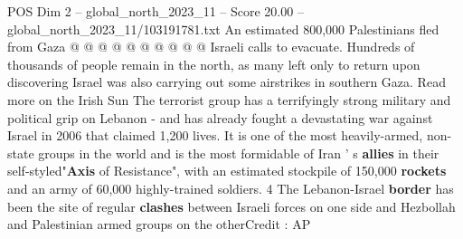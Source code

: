 \begin{textsample}{POS Dim 2 – global\_north\_2023\_11 – Score 20.00 – global\_north\_2023\_11/103191781.txt}
An estimated 800,000 Palestinians fled from Gaza @ @ @ @ @ @ @ @ @ @ Israeli calls to evacuate.
Hundreds of thousands of people remain in the north, as many left only to return upon discovering Israel was also carrying out some airstrikes in southern Gaza.
Read more on the Irish Sun The terrorist group has a terrifyingly strong military and political grip on Lebanon - and has already fought a devastating war against Israel in 2006 that claimed 1,200 lives.
It is one of the most heavily-armed, non-state groups in the world and is the most formidable of Iran ' s \textbf{allies} in their self-styled"\textbf{Axis} of Resistance", with an estimated stockpile of 150,000 \textbf{rockets} and an army of 60,000 highly-trained soldiers. 4 The Lebanon-Israel \textbf{border} has been the site of regular \textbf{clashes} between Israeli forces on one side and Hezbollah and Palestinian armed groups on the otherCredit : AP

\end{textsample}
